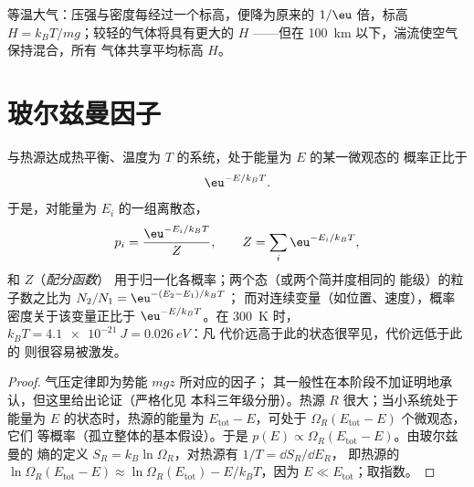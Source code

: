 \begin{omfigure}

{\small 等温大气：压强与密度每经过一个标高，便降为原来的 $1/\eu$
倍，标高 $H = k_BT/mg$；较轻的气体将具有更大的 $H$
——但在 \qty{100}{km} 以下，湍流使空气保持混合，所有
气体共享平均标高 $H$。}
\end{omfigure}

\section{玻尔兹曼因子}

\begin{theorem}[玻尔兹曼因子]\label{thm:b2:boltzmann-factor:factor}
与热源达成热平衡、温度为
$T$ 的系统，处于能量为 $E$ 的某一微观态的
概率正比于
\[
\eu^{-E/k_BT} .
\]
于是，对能量为 $E_i$ 的一组离散态，
\[
p_i = \frac{\eu^{-E_i/k_BT}}{Z}, \qquad Z = \sum_i\eu^{-E_i/k_BT} ,
\]
和 $Z$（\emph{配分函数}）
用于归一化各概率；两个态（或两个简并度相同的
能级）的粒子数之比为 $N_2/N_1 = \eu^{-(E_2 - E_1)/k_BT}$；
而对连续变量（如位置、速度），概率
密度关于该变量正比于 $\eu^{-E/k_BT}$。在
\qty{300}{K} 时，$k_BT = \qty{4.1e-21}{J} = \qty{0.026}{eV}$：凡
代价远高于此的状态很罕见，代价远低于此的
则很容易被激发。
\end{theorem}

\begin{proof}
气压定律即为势能 $mgz$ 所对应的因子；
其一般性在本阶段不加证明地承认，但这里给出论证（严格化见
本科三年级分册）。热源 $R$ 很大；当小系统处于
能量为 $E$ 的状态时，热源的能量为 $E_{\text{tot}} -
E$，可处于 $\Omega_R(E_{\text{tot}} - E)$ 个微观态，它们
等概率（孤立整体的基本假设）。于是
$p(E) \propto \Omega_R(E_{\text{tot}} - E)$。由玻尔兹曼的
熵的定义 $S_R = k_B\ln\Omega_R$，对热源有 $1/T = \dd S_R/\dd E_R$，
即热源的 $\ln\Omega_R(E_{\text{tot}} - E) \approx \ln\Omega_R(E_{\text{tot}})
- E/k_BT$，因为 $E \ll E_{\text{tot}}$；取指数。
\end{proof}


